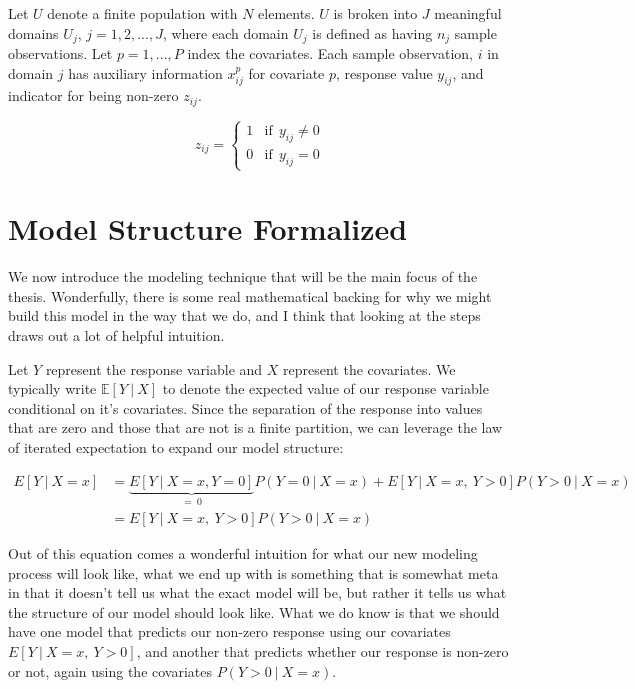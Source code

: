 \documentclass[12pt,twoside]{reedthesis}
\begin{document}
Let \(U\) denote a finite population with \(N\) elements. \(U\) is broken into \(J\) meaningful domains \(U_j\), \(j = 1, 2, ..., J\), where each domain \(U_j\) is defined as having \(n_j\) sample observations. Let \(p = 1, ..., P\) index the covariates. Each sample observation, \(i\) in domain \(j\) has auxiliary information \(x_{ij}^p\) for covariate \(p\), response value \(y_{ij}\), and indicator for being non-zero \(z_{ij}\).

\[
z_{ij} =
\begin{cases}
1 & \text{if}\ \ y_{ij} \ne 0 \\
0 & \text{if} \ \ y_{ij} = 0
\end{cases}
\]

\hypertarget{model-structure-formalized}{%
\section{Model Structure Formalized}\label{model-structure-formalized}}

We now introduce the modeling technique that will be the main focus of the thesis. Wonderfully, there is some real mathematical backing for why we might build this model in the way that we do, and I think that looking at the steps draws out a lot of helpful intuition.

Let \(Y\) represent the response variable and \(X\) represent the covariates. We typically write \(\mathbb{E}[Y \ | \ X]\) to denote the expected value of our response variable conditional on it's covariates. Since the separation of the response into values that are zero and those that are not is a finite partition, we can leverage the law of iterated expectation to expand our model structure:

\[
\begin{aligned}
    E[ Y  \ | \ X = x] &= \underbrace{E[Y \ | \ X = x, Y = 0]}_{= \ 0}P(Y = 0 \ | \ X = x) + E[Y \ | \ X = x, \ Y > 0]P(Y> 0 \ | \ X = x) \\
    &= E[Y \ | \ X = x, \ Y > 0]P(Y > 0 \ | \ X = x) 
\end{aligned}
\]

Out of this equation comes a wonderful intuition for what our new modeling process will look like, what we end up with is something that is somewhat meta in that it doesn't tell us what the exact model will be, but rather it tells us what the structure of our model should look like. What we do know is that we should have one model that predicts our non-zero response using our covariates \(E[Y \ | \ X = x, \ Y>0]\), and another that predicts whether our response is non-zero or not, again using the covariates \(P(Y > 0 \ | \ X = x)\).
\end{document}
